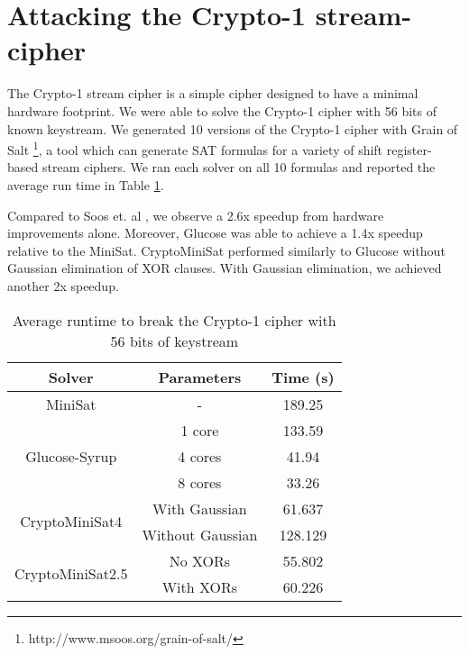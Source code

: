 \section{Attacking the Crypto-1 stream-cipher}
The Crypto-1 stream cipher is a simple cipher designed to have a minimal hardware footprint. We were able to solve the Crypto-1 cipher with 56 bits of known keystream. We generated 10 versions of the Crypto-1 cipher with Grain of Salt \footnote{http://www.msoos.org/grain-of-salt/}, a tool which can generate SAT formulas for a variety of shift register-based stream ciphers. We ran each solver on all 10 formulas and reported the average run time in Table \ref{table:crypto1:runtime}.

Compared to Soos et. al \cite{SNC09}, we observe a 2.6x speedup from hardware improvements alone. Moreover, Glucose was able to achieve a 1.4x speedup relative to the MiniSat. CryptoMiniSat performed similarly to Glucose without Gaussian elimination of XOR clauses. With Gaussian elimination, we achieved another 2x speedup. 

\begin{table}[!htbp]
	\centering
	\begin{tabular}{|c|c|c|}
		\hline
		\textbf{Solver} & \textbf{Parameters} & \textbf{Time (s)} \\
		\hline
		MiniSat & - & 189.25 \\
		\hline
		\multirow{3}{*}{Glucose-Syrup} & 1 core & 133.59 \\ \cline{2-3}
		& 4 cores & 41.94 \\ \cline{2-3}
		& 8 cores & 33.26 \\
		\hline
		
		\multirow{2}{*}{CryptoMiniSat4} & With Gaussian & 61.637 \\ \cline{2-3}
		& Without Gaussian & 128.129 \\ \cline{2-3} 
		\hline
		
		\multirow{2}{*}{CryptoMiniSat2.5} & No {XORs} & 55.802 \\ \cline{2-3} 
		& With {XORs} & 60.226 \\ \cline{2-3}
		\hline
	\end{tabular}
	
	\caption{Average runtime to break the Crypto-1 cipher with 56 bits of keystream}
	\label{table:crypto1:runtime}
\end{table}